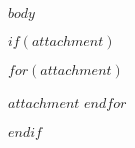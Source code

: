 \documentclass[$language$]{tfbrief}
\date{$date$}
\date{\today}
\begin{document}
\begin{letter}

$body$

\end{letter}

\vspace*{1cm}

$if(attachment)$
\begin{attachment}
$for(attachment)$
\item $attachment$
$endfor$
\end{attachment}
$endif$
\end{document}
